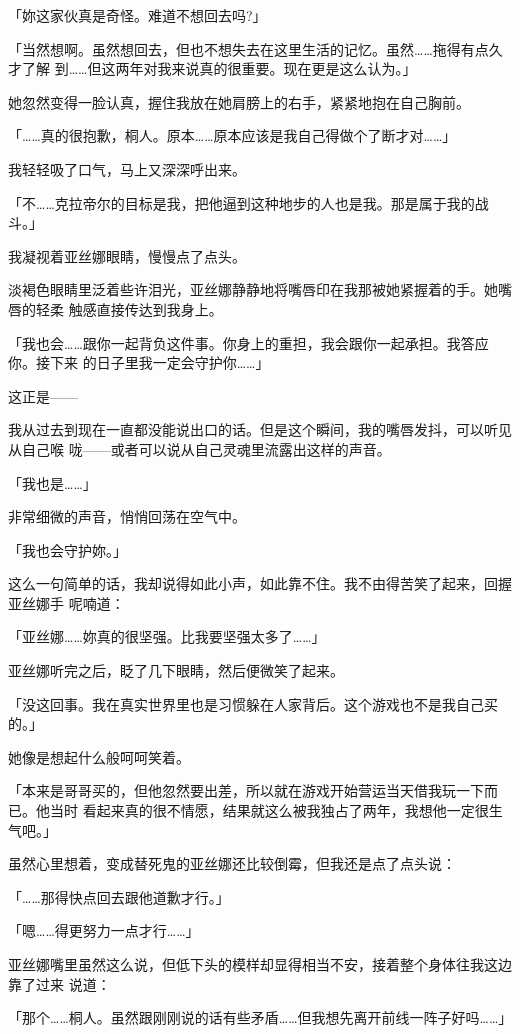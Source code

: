 \documentclass[11pt]{book}
\begin{document}
「妳这家伙真是奇怪。难道不想回去吗?」

「当然想啊。虽然想回去，但也不想失去在这里生活的记忆。虽然……拖得有点久才了解
到……但这两年对我来说真的很重要。现在更是这么认为。」

她忽然变得一脸认真，握住我放在她肩膀上的右手，紧紧地抱在自己胸前。

「……真的很抱歉，桐人。原本……原本应该是我自己得做个了断才对……」

我轻轻吸了口气，马上又深深呼出来。

「不……克拉帝尔的目标是我，把他逼到这种地步的人也是我。那是属于我的战斗。」

我凝视着亚丝娜眼睛，慢慢点了点头。

淡褐色眼睛里泛着些许泪光，亚丝娜静静地将嘴唇印在我那被她紧握着的手。她嘴唇的轻柔
触感直接传达到我身上。

「我也会……跟你一起背负这件事。你身上的重担，我会跟你一起承担。我答应你。接下来
的日子里我一定会守护你……」

这正是——

我从过去到现在一直都没能说出口的话。但是这个瞬间，我的嘴唇发抖，可以听见从自己喉
咙——或者可以说从自己灵魂里流露出这样的声音。

「我也是……」

非常细微的声音，悄悄回荡在空气中。

「我也会守护妳。」

这么一句简单的话，我却说得如此小声，如此靠不住。我不由得苦笑了起来，回握亚丝娜手
呢喃道：

「亚丝娜……妳真的很坚强。比我要坚强太多了……」

亚丝娜听完之后，眨了几下眼睛，然后便微笑了起来。

「没这回事。我在真实世界里也是习惯躲在人家背后。这个游戏也不是我自己买的。」

她像是想起什么般呵呵笑着。

「本来是哥哥买的，但他忽然要出差，所以就在游戏开始营运当天借我玩一下而已。他当时
看起来真的很不情愿，结果就这么被我独占了两年，我想他一定很生气吧。」

虽然心里想着，变成替死鬼的亚丝娜还比较倒霉，但我还是点了点头说：

「……那得快点回去跟他道歉才行。」

「嗯……得更努力一点才行……」

亚丝娜嘴里虽然这么说，但低下头的模样却显得相当不安，接着整个身体往我这边靠了过来
说道：

「那个……桐人。虽然跟刚刚说的话有些矛盾……但我想先离开前线一阵子好吗……」
\end{document}
